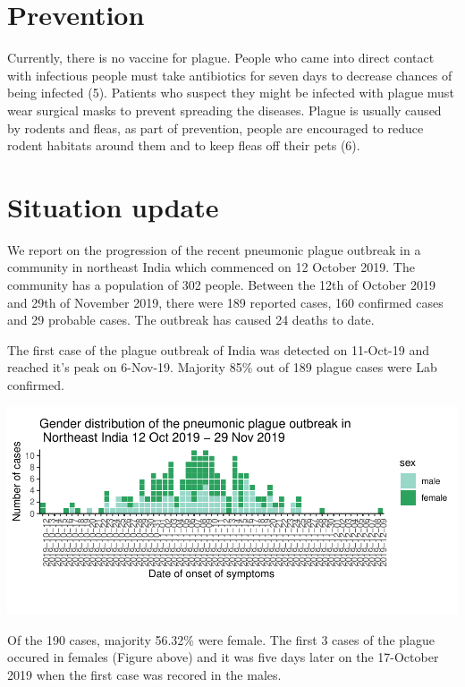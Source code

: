 \documentclass[
]{article}
\begin{document}
\hypertarget{prevention}{%
\section{Prevention}\label{prevention}}

Currently, there is no vaccine for plague. People who came into direct
contact with infectious people must take antibiotics for seven days to
decrease chances of being infected (5). Patients who suspect they might
be infected with plague must wear surgical masks to prevent spreading
the diseases. Plague is usually caused by rodents and fleas, as part of
prevention, people are encouraged to reduce rodent habitats around them
and to keep fleas off their pets (6).

\hypertarget{situation-update}{%
\section{Situation update}\label{situation-update}}

We report on the progression of the recent pneumonic plague outbreak in
a community in northeast India which commenced on 12 October 2019. The
community has a population of 302 people. Between the 12th of October
2019 and 29th of November 2019, there were 189 reported cases, 160
confirmed cases and 29 probable cases. The outbreak has caused 24 deaths
to date.

The first case of the plague outbreak of India was detected on 11-Oct-19
and reached it's peak on 6-Nov-19. Majority 85\% out of 189 plague cases
were Lab confirmed.

\begin{flushleft}\includegraphics{Plague_SitRep_files/figure-latex/unnamed-chunk-2-1} \end{flushleft}

Of the 190 cases, majority 56.32\% were female. The first 3 cases of the
plague occured in females (Figure above) and it was five days later on
the 17-October 2019 when the first case was recored in the males.
\end{document}
